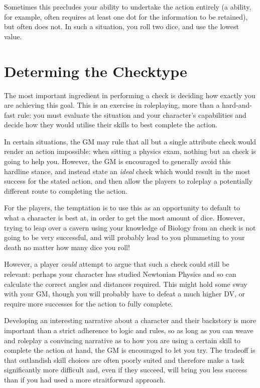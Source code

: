 Sometimes this precludes your ability to undertake the action entirely (a  ability, for example, often requires at least one dot for the information to be retained), but often does not. In such a situation, you roll two dice, and use the lowest value. 


\section{Determing the Checktype}

The most important ingredient in performing a check is deciding how exactly you are achieving this goal. This is an exercise in roleplaying, more than a hard-and-fast rule: you must evaluate the situation and your character's capabilities and decide how they would utilise their skills to best complete the action. 

In certain situations, the GM may rule that all but a single attribute check would render an action impossible: when sitting a physics exam, nothing but an  check is going to help you. However, the GM is encouraged to generally avoid this hardline stance, and instead state an {\it ideal} check which would result in the most success for the stated action, and then allow the players to roleplay a potentially different route to completing the action. 

For the players, the temptation is to use this as an opportunity to default to what a character is best at, in order to get the most amount of dice. However, trying to leap over a cavern using your knowledge of Biology from an  check is not going to be very successful, and will probably lead to you plummeting to your death no matter how many dice you roll! 

However, a player {\it could} attempt to argue that such a check could still be relevant: perhaps your character has studied Newtonian Physics and so can calculate the correct angles and distances required. This might hold some sway with your GM, though you will probably have to defeat a much higher DV, or require more successes for the action to fully complete. 

Developing an interesting narrative about a character and their backstory is more important than a strict adherence to logic and rules, so as long as you can weave and roleplay a convincing narrative as to how you are using a certain skill to complete the action at hand, the GM is encouraged to let you try. The tradeoff is that outlandish skill choices are often poorly suited and therefore make a task significantly more difficult and, even if they succeed, will bring you less success than if you had used a more straitforward approach. 

